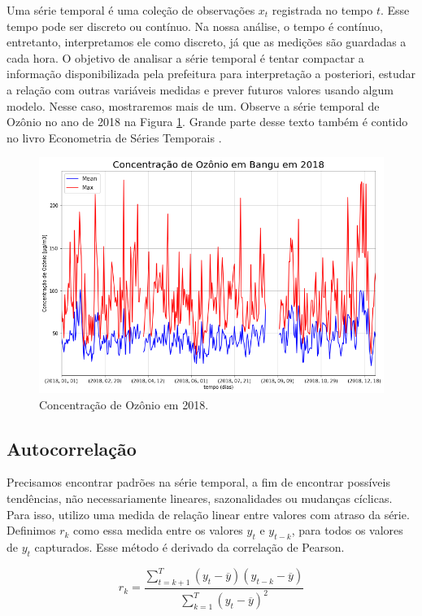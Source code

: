 Uma série temporal é uma coleção de observações $x_t$ registrada no tempo $t$.
Esse tempo pode ser discreto ou contínuo. Na nossa análise, o tempo é contínuo,
entretanto, interpretamos ele como discreto, já que as medições são guardadas a
cada hora. O objetivo de analisar a série temporal é tentar compactar a
informação disponibilizada pela prefeitura para interpretação a posteriori,
estudar a relação com outras variáveis medidas e prever futuros valores usando
algum modelo. Nesse caso, mostraremos mais de um. Observe a série temporal de
Ozônio no ano de 2018 na Figura \ref{time-series}. Grande parte desse texto
também é contido no livro Econometria de Séries Temporais \cite{econometria}. 

\begin{figure}[!t]
    \includegraphics[width=\linewidth]{img/graphic4.png}
    \caption{Concentração de Ozônio em 2018.}
    \label{time-series}
\end{figure}

\subsection{Autocorrelação}

Precisamos encontrar padrões na série temporal, a fim de encontrar possíveis
tendências, não necessariamente lineares, sazonalidades ou mudanças cíclicas. Para
isso, utilizo uma medida de relação linear entre valores com atraso da série.
Definimos $r_k$ como essa medida entre os valores $y_t$ e $y_{t - k}$, para
todos os valores de $y_t$ capturados. Esse método é derivado da correlação de
Pearson. 

\begin{equation}
    \label{autocorrelation}
    r_k = \frac{\sum_{t = k + 1}^T (y_t - \overline{y})(y_{t - k} -
    \overline{y})}{\sum_{k=1}^T (y_t - \overline{y})^2}    
\end{equation}

